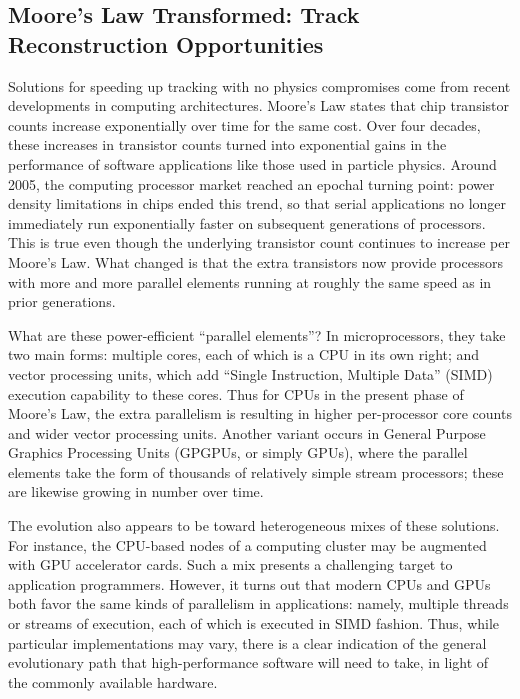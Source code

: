 \documentclass[a4paper,11pt]{article}
\begin{document}
\subsection{Moore's Law Transformed: Track Reconstruction Opportunities}
\label{sec:moore-trk}
Solutions for speeding up tracking with no physics compromises come from recent developments in computing architectures. Moore's Law states that chip transistor counts increase exponentially over time for the same cost.  Over four decades, these increases in transistor counts turned into exponential gains in the performance of software applications like those used in particle physics.  Around 2005, the computing processor market reached an epochal turning point: power density limitations in chips ended this trend, so that serial applications no longer immediately run exponentially faster on subsequent generations of processors.  This is true even though the underlying transistor count continues to increase per Moore's Law. What changed is that the extra transistors now provide processors with more and more parallel elements running at roughly the same speed as in prior generations.

What are these power-efficient ``parallel elements''? In microprocessors, they take two main forms: multiple cores, each of which is a CPU in its own right; and vector processing units, which add ``Single Instruction, Multiple Data'' (SIMD) execution capability to these cores. Thus for CPUs in the present phase of Moore's Law, the extra parallelism is resulting in higher per-processor core counts and wider vector processing units. Another variant occurs in General Purpose Graphics Processing Units (GPGPUs, or simply GPUs), where
the parallel elements take the form of thousands of relatively simple stream processors; these are likewise growing in number over time.

The evolution also appears to be toward heterogeneous mixes of these solutions. For instance, the CPU-based nodes of a computing cluster may be augmented with GPU accelerator cards. Such a mix presents a challenging target to application programmers. However, it turns out that modern CPUs and GPUs both favor the same kinds of parallelism in applications: namely, multiple threads or streams of execution, each of which is executed in SIMD fashion. Thus, while particular implementations may vary, there is a clear indication of the general evolutionary path that high-performance software will need to take, in light of the commonly available hardware.
\end{document}
